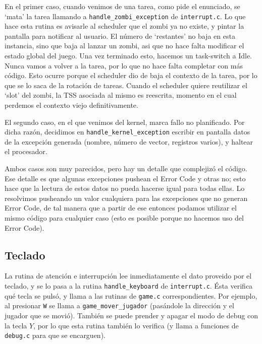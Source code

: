 \documentclass{article}
\begin{document}
    En el primer caso, cuando venimos de una tarea, como pide el enunciado, se `mata' la tarea
    llamando a \texttt{handle\_zombi\_exception} de \texttt{interrupt.c}. Lo que hace esta rutina es
    avisarle al scheduler que el zombi ya no existe, y pintar la pantalla para notificar al usuario.
    El número de `restantes' no baja en esta instancia, sino que baja al lanzar un zombi, asi que no
    hace falta modificar el estado global del juego. Una vez terminado esto, hacemos un task-switch
    a Idle. Nunca vamos a volver a la tarea, por lo que no hace falta completar con más código. Esto
    ocurre porque el scheduler dio de baja el contexto de la tarea, por lo que se lo saca de la
    rotación de tareas. Cuando el scheduler quiere reutilizar el `slot' del zombi, la TSS asociada
    al mismo es reescrita, momento en el cual perdemos el contexto viejo definitivamente. 

	El segundo caso, en el que venimos del kernel, marca fallo no planificado. Por dicha razón, decidimos en \texttt{handle\_kernel\_exception} escribir en pantalla datos de la excepción generada (nombre, número de vector, registros varios), y haltear el procesador.

	Ambos casos son muy parecidos, pero hay un detalle que complejizó el código. Ese detalle es que algunas excepciones pushean el Error Code y otras no; esto hace que la lectura de estos datos no pueda hacerse igual para todas ellas. Lo resolvimos pusheando un valor cualquiera para las excepciones que no generan Error Code, de tal manera que a partir de ese entonces podamos utilizar el mismo código para cualquier caso (esto es posible porque no hacemos uso del Error Code).

	\subsection*{Teclado}

	La rutina de atención e interrupción lee inmediatamente el dato proveido por el teclado, y se lo pasa a la rutina \texttt{handle\_keyboard} de \texttt{interrupt.c}. Ésta verifica qué tecla se pulsó, y llama a las rutinas de \texttt{game.c} correspondientes. Por ejemplo, al presionar \texttt{W} se llama a \texttt{game\_mover\_jugador} (pasándole la dirección y el jugador que se movió). También se puede prender y apagar el modo de debug con la tecla $Y$, por lo que esta rutina también lo verifica (y llama a funciones de \texttt{debug.c} para que se encarguen).
\end{document}

